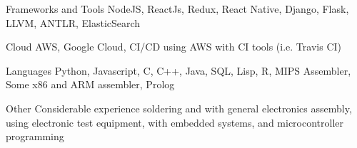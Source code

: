 
\begin{cvskills}
  \vspace{2mm}
  \cvskill
    {Frameworks and Tools}
    {NodeJS, ReactJs, Redux, React Native, Django, Flask, LLVM, ANTLR, ElasticSearch}

  \vspace{2mm}
  \cvskill
    {Cloud}
    {AWS, Google Cloud, CI/CD using AWS with CI tools (i.e. Travis CI)}

  \vspace{2mm}
  \cvskill
    {Languages} %
    {Python, Javascript, C, C++, Java, SQL, Lisp, R, MIPS Assembler, Some x86 and ARM assembler, Prolog}

  \vspace{2mm}
  \cvskill
    {Other}
    {Considerable experience soldering and with general electronics assembly, using electronic test equipment, with\newline
    embedded systems, and microcontroller programming}
\end{cvskills}
